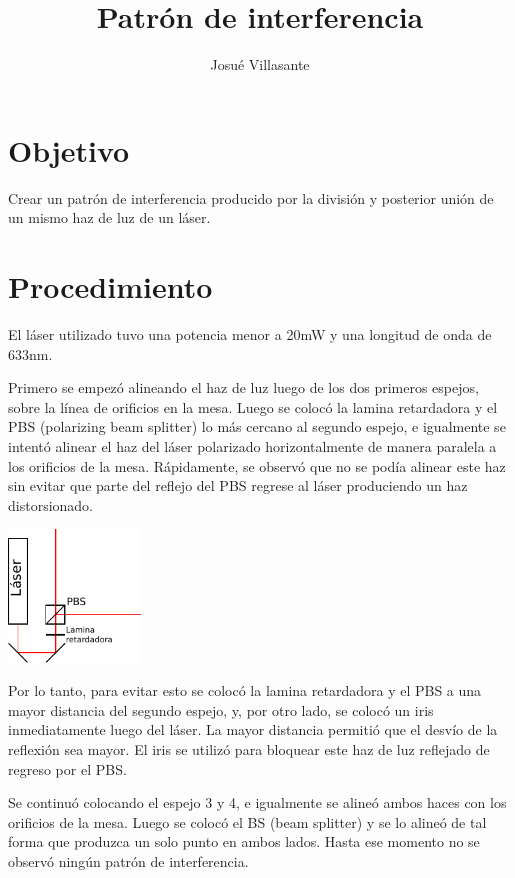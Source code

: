 \documentclass[twocolumn]{article}
\author{Josué Villasante}
\title{Patrón de interferencia}
\begin{document}
	\maketitle

	\section{Objetivo}
		Crear un patrón de interferencia producido por la división y posterior unión de un mismo haz de luz de un láser.

	\section{Procedimiento}
		El láser utilizado tuvo una potencia menor a 20mW y una longitud de onda de 633nm.

		Primero se empezó alineando el haz de luz luego de los dos primeros espejos, sobre la línea de orificios en la mesa. Luego se colocó la lamina retardadora y el PBS (polarizing beam splitter) lo más cercano al segundo espejo, e igualmente se intentó alinear el haz del láser polarizado horizontalmente de manera paralela a los orificios de la mesa. Rápidamente, se observó que no se podía alinear este haz sin evitar que parte del reflejo del PBS regrese al láser produciendo un haz distorsionado.

		\begin{center}
			\includegraphics[width=100pt]{img/layout_attempt.pdf}
		\end{center}

		Por lo tanto, para evitar esto se colocó la lamina retardadora y el PBS a una mayor distancia del segundo espejo, y, por otro lado, se colocó un iris inmediatamente luego del láser. La mayor distancia permitió que el desvío de la reflexión sea mayor. El iris se utilizó para bloquear este haz de luz reflejado de regreso por el PBS.

		Se continuó colocando el espejo 3 y 4, e igualmente se alineó ambos haces con los orificios de la mesa. Luego se colocó el BS (beam splitter) y se lo alineó de tal forma que produzca un solo punto en ambos lados. Hasta ese momento no se observó ningún patrón de interferencia.
\end{document}
